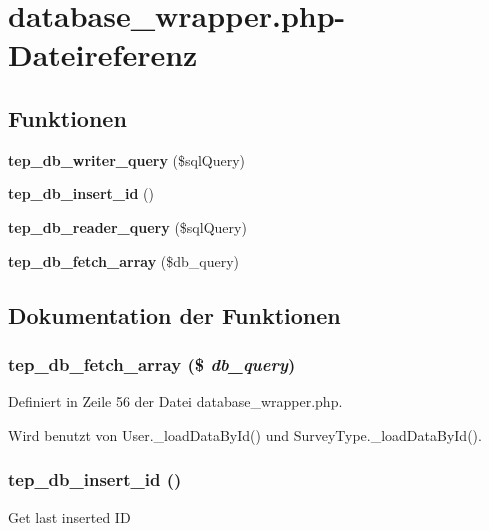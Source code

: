 \section{database\_\-wrapper.php-Dateireferenz}
\label{database__wrapper_8php}
\subsection*{Funktionen}
\begin{CompactItemize}
\item 
{\bf tep\_\-db\_\-writer\_\-query} (\$sqlQuery)
\item 
{\bf tep\_\-db\_\-insert\_\-id} ()
\item 
{\bf tep\_\-db\_\-reader\_\-query} (\$sqlQuery)
\item 
{\bf tep\_\-db\_\-fetch\_\-array} (\$db\_\-query)
\end{CompactItemize}


\subsection{Dokumentation der Funktionen}
\subsubsection{\setlength{\rightskip}{0pt plus 5cm}tep\_\-db\_\-fetch\_\-array (\$ {\em db\_\-query})}\label{database__wrapper_8php_801e3ae24b9c3f76a5566142c4fc67ca}




Definiert in Zeile 56 der Datei database\_\-wrapper.php.

Wird benutzt von User.\_\-loadDataById() und SurveyType.\_\-loadDataById().
\subsubsection{\setlength{\rightskip}{0pt plus 5cm}tep\_\-db\_\-insert\_\-id ()}\label{database__wrapper_8php_6d68b3353ab90af95e317cea4b008bb4}


Get last inserted ID

